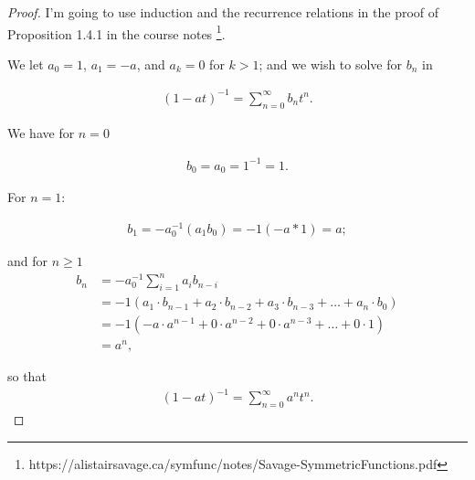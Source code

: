 \documentclass[12pt]{extarticle}
\newcommand{\<}{\langle}
\renewcommand{\>}{\rangle}
\theoremstyle{definition}
\begin{document}
\begin{proof}
  I'm going to use induction and the recurrence relations in the proof of Proposition 1.4.1 in the course notes \footnote{https://alistairsavage.ca/symfunc/notes/Savage-SymmetricFunctions.pdf}.

  We let $a_0 = 1$, $a_1 = -a$, and $a_k = 0$ for $k > 1$; and we wish to solve for $b_n$ in 

  \begin{align*}
    (1-at)^{-1} = \sum\limits_{n=0}^{\infty} b_n t^n.
  \end{align*}

  We have for $n=0$

  \begin{align*}
    b_0 = a_0 = 1^{-1} = 1.
  \end{align*}

  For $n=1$:


  \begin{align*}
    b_1 = -a_0^{-1}(a_1 b_0) = -1 (-a*1) = a;
  \end{align*}

  and for $n \geq 1$
  \begin{align*}
    b_n
    &= -a_0^{-1}\sum\limits_{i=1}^n a_i b_{n-i} \\
    &= -1 (a_1\cdot b_{n-1} + a_2 \cdot b_{n-2} + a_3 \cdot b_{n-3} + \dots + a_n \cdot b_0) \\
    &= -1 (-a \cdot a^{n-1} + 0 \cdot a^{n-2} + 0 \cdot a^{n-3} + \dots + 0 \cdot1) \\
    &= a^n,
  \end{align*}

  so that
    \begin{align*}
    (1-at)^{-1} = \sum\limits_{n=0}^{\infty} a^n t^n.
  \end{align*}

\end{proof}
\end{document}
